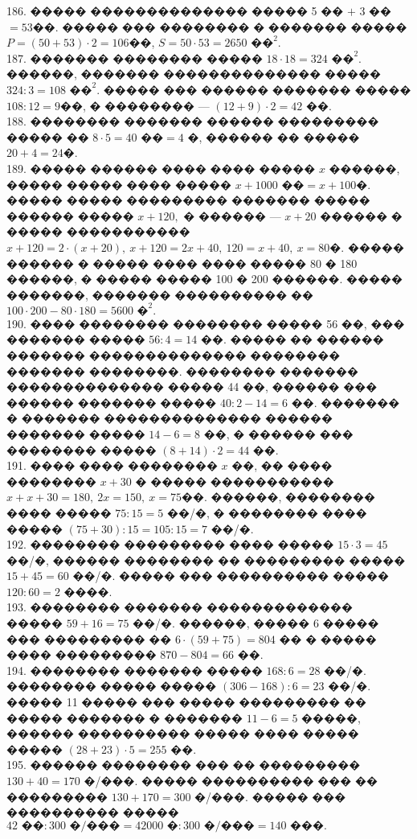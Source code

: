 \documentclass[12pt]{article}
\begin{document}
186. ����� �������������� ����� 5 �� $+$ 3 �� $=53$��. ����� ��� �������� � ������� ����� $P=(50+53)\cdot2=106$��, $S=50\cdot53=2650\text{ ��}^2.$\\
187. ������� �������� ����� $18\cdot18=324\text{ ��}^2.$ ������, ������� �������������� ����� $324:3=108\text{ ��}^2.$ ����� ��� ������ ������� ����� $108:12=9$��, � �������� --- $(12+9)\cdot2=42$ ��.\\
188. �������� ������� ������ ��������� ����� �� $8\cdot5=40\text{ ��}=4$ �, ������ �� ����� $20+4=24$�.\\
189. ����� ������ ���� ���� ����� $x$ ������, ����� ����� ���� ����� $x+1000\text{ ��}=x+100$�. ����� ����� ��������� ������� ����� ������ ����� $x+120,$ � ������ --- $x+20$ ������ � ����� ����������� $x+120=2\cdot(x+20),\ x+120=2x+40,\ 120=x+40,\ x=80$�. ����� ������ � ����� ���� ���� ����� 80 � 180 ������, � ����� ����� 100 � 200 ������. ����� �������, ������� ���������� �� $100\cdot200-80\cdot180=5600\text{ �}^2.$\\
190. ���� �������� �������� ����� 56 ��, ��� ������� ����� $56:4=14$ ��. ����� �� ������ ������� �������������� �������� ������� ��������. �������� ������� �������������� ����� 44 ��, ������ ��� ������ ������� ����� $40:2-14=6$ ��. ������� � ������� �������������� ������ ������� ����� $14-6=8$ ��, � ������ ��� �������� ����� $(8+14)\cdot2=44$ ��.\\
191. ���� ���� �������� $x$ ��, �� ���� �������� $x+30$ � ����� ����������� $x+x+30=180,\ 2x=150,\ x=75$��. ������, �������� ���� ����� $75:15=5$ ��/�, � �������� ���� ����� $(75+30):15=105:15=7$ ��/�.\\
192. �������� ��������� ���� ����� $15\cdot3=45$ ��/�, ������ �������� �� ��������� ����� $15+45=60$ ��/�. ����� ��� ���������� ����� $120:60=2$ ����.\\
193. �������� ������� ������������� ����� $59+16=75$ ��/�. ������, ����� 6 ����� ��� ��������� �� $6\cdot(59+75)=804$ �� � ����� ���� ��������� $870-804=66$ ��.\\
194. �������� ������� ����� $168:6=28$ ��/�. �������� ����� ����� $(306-168):6=23$ ��/�. ����� 11 ����� ��� ����� ��������� �� ����� ������� � ������� $11-6=5$ �����, ������ ���������� ����� ���� ����� ����� $(28+23)\cdot5=255$ ��.\\
195. ������ �������� ��� �� ��������� $130+40=170$ �/���. ����� ���������� ��� �� ��������� $130+170=300$ �/���. ����� ��� ���������� ����� $42\text{ ��}:300\text{ �/���}=42000\text{ �}:300\text{ �/���}=140\text{ ���.}$\\
\end{document}

